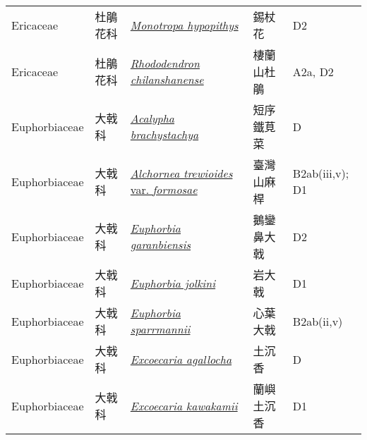 {\begin{longtable}{p{2.5cm}p{2cm}p{5cm}p{2.5cm}p{3cm}}
    Ericaceae & 杜鵑花科 & \href{http://www.theplantlist.org/tpl1.1/search?q=Monotropa+hypopithys}{\textit{Monotropa hypopithys} } & 錫杖花 & D2 \index{Monotropa@\textit{Monotropa}!hypopithys@\textit{hypopithys}}  \index{錫杖花} \\
    Ericaceae & 杜鵑花科 & \href{http://www.theplantlist.org/tpl1.1/search?q=Rhododendron+chilanshanense}{\textit{Rhododendron chilanshanense} } & 棲蘭山杜鵑 & A2a, D2 \index{Rhododendron@\textit{Rhododendron}!chilanshanense@\textit{chilanshanense}}  \index{棲蘭山杜鵑} \\
    Euphorbiaceae & 大戟科 & \href{http://www.theplantlist.org/tpl1.1/search?q=Acalypha+brachystachya}{\textit{Acalypha brachystachya} } & 短序鐵莧菜 & D \index{Acalypha@\textit{Acalypha}!brachystachya@\textit{brachystachya}}  \index{短序鐵莧菜} \\
    Euphorbiaceae & 大戟科 & \href{http://www.theplantlist.org/tpl1.1/search?q=Alchornea+trewioides+var.+formosae}{\textit{Alchornea trewioides} var. \textit{formosae} } & 臺灣山麻桿 & B2ab(iii,v); D1 \index{Alchornea@\textit{Alchornea}!trewioides@\textit{trewioides}!var. formosae@var. \textit{formosae}}  \index{臺灣山麻桿} \\
    Euphorbiaceae & 大戟科 & \href{http://www.theplantlist.org/tpl1.1/search?q=Euphorbia+garanbiensis}{\textit{Euphorbia garanbiensis} } & 鵝鑾鼻大戟 & D2 \index{Euphorbia@\textit{Euphorbia}!garanbiensis@\textit{garanbiensis}}  \index{鵝鑾鼻大戟} \\
    Euphorbiaceae & 大戟科 & \href{http://www.theplantlist.org/tpl1.1/search?q=Euphorbia+jolkini}{\textit{Euphorbia jolkini} } & 岩大戟 & D1 \index{Euphorbia@\textit{Euphorbia}!jolkini@\textit{jolkini}}  \index{岩大戟} \\
    Euphorbiaceae & 大戟科 & \href{http://www.theplantlist.org/tpl1.1/search?q=Euphorbia+sparrmannii}{\textit{Euphorbia sparrmannii} } & 心葉大戟 & B2ab(ii,v) \index{Euphorbia@\textit{Euphorbia}!sparrmannii@\textit{sparrmannii}}  \index{心葉大戟} \\
    Euphorbiaceae & 大戟科 & \href{http://www.theplantlist.org/tpl1.1/search?q=Excoecaria+agallocha}{\textit{Excoecaria agallocha} } & 土沉香 & D \index{Excoecaria@\textit{Excoecaria}!agallocha@\textit{agallocha}}  \index{土沉香} \\
    Euphorbiaceae & 大戟科 & \href{http://www.theplantlist.org/tpl1.1/search?q=Excoecaria+kawakamii}{\textit{Excoecaria kawakamii} } & 蘭嶼土沉香 & D1 \index{Excoecaria@\textit{Excoecaria}!kawakamii@\textit{kawakamii}}  \index{蘭嶼土沉香} \\

\end{longtable}}
